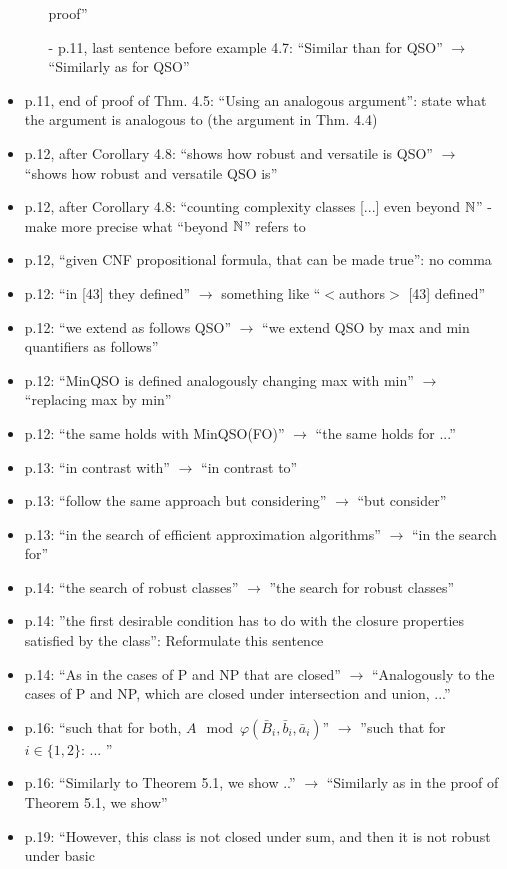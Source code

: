 \begin{itemize}
\begin{itemize}
	proof''
	\item[-] p.11, last sentence before example 4.7: ``Similar than for QSO'' $\to$ ``Similarly as for QSO''
	\end{itemize}
	\item p.11, end of proof of Thm. 4.5: ``Using an analogous argument'': state what the argument is
	analogous to (the argument in Thm. 4.4)
	\item p.12, after Corollary 4.8: ``shows how robust and versatile is QSO'' $\to$ ``shows how robust and
	versatile QSO is''
	\item p.12, after Corollary 4.8: ``counting complexity classes [...] even beyond $\mathbb{N}$'' - make more precise
	what ``beyond $\mathbb{N}$'' refers to
	\item p.12, ``given CNF propositional formula, that can be made true'': no comma
	\item p.12: ``in [43] they defined'' $\to$ something like ``$<$authors$>$ [43] defined''
	\item p.12: ``we extend as follows QSO'' $\to$ ``we extend QSO by max and min quantifiers as follows''
	\item p.12: ``MinQSO is defined analogously changing max with min'' $\to$ ``replacing max by min''
	\item p.12: ``the same holds with MinQSO(FO)'' $\to$ ``the same holds for ...''
	\item p.13: ``in contrast with'' $\to$ ``in contrast to''
	\item p.13: ``follow the same approach but considering'' $\to$ ``but consider''
	\item p.13: ``in the search of efficient approximation algorithms'' $\to$ ``in the search for''
	\item p.14: ``the search of robust classes'' $\to$ ''the search for robust classes''
	\item p.14: ''the first desirable condition has to do with the closure properties satisfied by the class'':
	Reformulate this sentence
	\item p.14: ``As in the cases of P and NP that are closed'' $\to$ ``Analogously to the cases of P and
	NP, which are closed under intersection and union, ...''
	\item p.16: ``such that for both, $A\mod\varphi(\bar{B}_i,\bar{b}_i,\bar{a}_i)$'' $\to$ ''such that for $i \in \{1,2\}$: ... ''
	\item p.16: ``Similarly to Theorem 5.1, we show ..'' $\to$ ``Similarly as in the proof of Theorem 5.1, we
	show''
	\item p.19: ``However, this class is not closed under sum, and then it is not robust under basic

\end{itemize}
